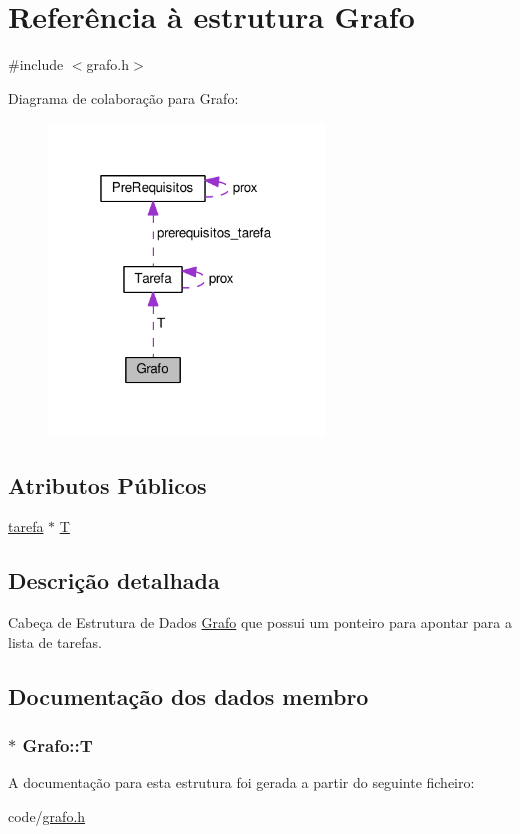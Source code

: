 \hypertarget{structGrafo}{\section{Referência à estrutura Grafo}
\label{structGrafo}
}


{\ttfamily \#include $<$grafo.\-h$>$}



Diagrama de colaboração para Grafo\-:\nopagebreak
\begin{figure}[H]
\begin{center}
\leavevmode
\includegraphics[width=208pt]{structGrafo__coll__graph}
\end{center}
\end{figure}
\subsection*{Atributos Públicos}
\begin{DoxyCompactItemize}
\item 
\hyperlink{code_2grafo_8h_ab156210f10bb550f6d61bea964f08c22}{tarefa} $\ast$ \hyperlink{structGrafo_afc952e8b929d2766e937fd330b8e83d9}{T}
\end{DoxyCompactItemize}


\subsection{Descrição detalhada}
Cabeça de Estrutura de Dados \hyperlink{structGrafo}{Grafo} que possui um ponteiro para apontar para a lista de tarefas. 

\subsection{Documentação dos dados membro}
\hypertarget{structGrafo_afc952e8b929d2766e937fd330b8e83d9}{
\subsubsection[{T}]{ $\ast$ Grafo\-::\-T}}\label{structGrafo_afc952e8b929d2766e937fd330b8e83d9}


A documentação para esta estrutura foi gerada a partir do seguinte ficheiro\-:\begin{DoxyCompactItemize}
\item 
code/\hyperlink{code_2grafo_8h}{grafo.\-h}\end{DoxyCompactItemize}
